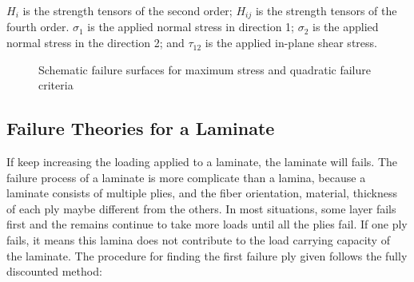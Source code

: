 $H_i$ is the strength tensors of the second order; $H_{ij}$ is the strength
tensors of the fourth order. $\sigma_1$ is the applied normal stress in 
direction 1; $\sigma_2$ is the applied normal stress in the direction 2; and
$\tau_{12}$ is the applied in-plane shear stress.





\begin{figure}
\centering
{}
\caption{Schematic failure surfaces for maximum stress and quadratic failure
criteria}
\end{figure}


\subsection{Failure Theories for a Laminate}
If keep increasing the loading applied to a laminate, the laminate will fails. The failure process
of a laminate is more complicate than a lamina, because a laminate consists of multiple plies, and
the fiber orientation, material, thickness of each ply maybe different from the others. In most
situations, some layer fails first and the remains continue to take more loads until all the plies
fail.  If one ply fails, it means this lamina does not contribute to the load carrying capacity of
the laminate. The procedure for finding the first failure ply given follows the fully discounted
method:

